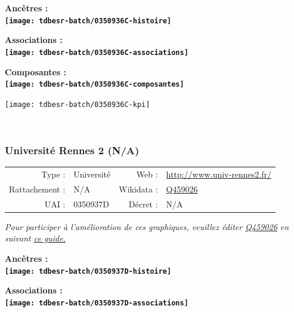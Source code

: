 \documentclass[12pt,french,]{article}
\begin{document}
\vspace{1cm}  
\begin{minipage}[b]{0.50\textwidth}\begin{center} \bf Ancêtres : \\  
\texttt{[image: tdbesr-batch/0350936C-histoire]} \end{center}\end{minipage}\begin{minipage}[b]{0.50\textwidth}\begin{center} \bf Associations : \\  
\texttt{[image: tdbesr-batch/0350936C-associations]} \end{center}\end{minipage}

\hrulefill

\begin{center} \bf Composantes : \\  
\texttt{[image: tdbesr-batch/0350936C-composantes]} \end{center}

\begin{center}\texttt{[image: tdbesr-batch/0350936C-kpi]} \end{center}\checkoddpage

\ifoddpage ~\newpage \fi   

\hypertarget{universituxe9-rennes-2-na}{%
\subsubsection{Université Rennes 2
(N/A)}\label{universituxe9-rennes-2-na}}

\begin{tabular*}{\textwidth}{rp{5cm}rl}  
\hline  
Type : & Université & Web : &\href{http://www.univ-rennes2.fr/}{http://www.univ-rennes2.fr/} \\  
Rattachement : & N/A & Wikidata : & \href{https://www.wikidata.org/entity/Q459026}{Q459026} \\  
UAI : & 0350937D & Décret : & N/A \\  
\hline  
\end{tabular*}

\textit{\scriptsize Pour participer à l'amélioration de ces graphiques, veuillez éditer  \href{https://www.wikidata.org/entity/Q459026}{Q459026}  en suivant \href{https://github.com/cpesr/wikidataESR/blob/master/Rmd/wikidataESR.md}{ce guide.}}

\vspace{1cm}  
\begin{minipage}[b]{0.50\textwidth}\begin{center} \bf Ancêtres : \\  
\texttt{[image: tdbesr-batch/0350937D-histoire]} \end{center}\end{minipage}\begin{minipage}[b]{0.50\textwidth}\begin{center} \bf Associations : \\  
\texttt{[image: tdbesr-batch/0350937D-associations]} \end{center}\end{minipage}
\end{document}
